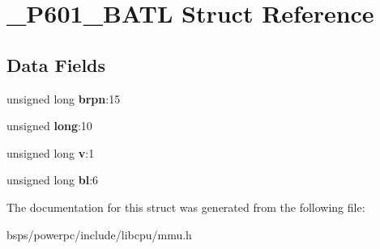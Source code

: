 \hypertarget{struct__P601__BATL}{}\section{\+\_\+\+P601\+\_\+\+B\+A\+TL Struct Reference}
\label{struct__P601__BATL}
\subsection*{Data Fields}
\begin{DoxyCompactItemize}
\item 
\mbox{\label{struct__P601__BATL_a4c6536bd665aaafc4c9741b6e0c21b53}} 
unsigned long {\bfseries brpn}\+:15
\item 
\mbox{\label{struct__P601__BATL_adc57a004105b487b834a2a741a0a414b}} 
unsigned {\bfseries long}\+:10
\item 
\mbox{\label{struct__P601__BATL_aecbbd2291f962293926cb52a237ad8e4}} 
unsigned long {\bfseries v}\+:1
\item 
\mbox{\label{struct__P601__BATL_a7fe23730d249003078893784db56ea22}} 
unsigned long {\bfseries bl}\+:6
\end{DoxyCompactItemize}


The documentation for this struct was generated from the following file\+:\begin{DoxyCompactItemize}
\item 
bsps/powerpc/include/libcpu/mmu.\+h\end{DoxyCompactItemize}
